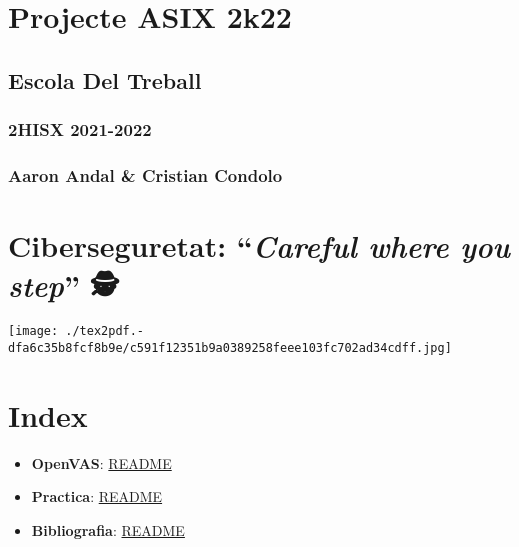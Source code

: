 \documentclass[]{article}
\date{}
\begin{document}
\hypertarget{projecte-asix-2k22}{%
\section{\texorpdfstring{\textbf{Projecte ASIX
2k22}}{Projecte ASIX 2k22}}\label{projecte-asix-2k22}}

\hypertarget{escola-del-treball}{%
\subsection{\texorpdfstring{\textbf{Escola Del
Treball}}{Escola Del Treball}}\label{escola-del-treball}}

\hypertarget{hisx-2021-2022}{%
\subsubsection{\texorpdfstring{\textbf{2HISX
2021-2022}}{2HISX 2021-2022}}\label{hisx-2021-2022}}

\hypertarget{aaron-andal-cristian-condolo}{%
\subsubsection{\texorpdfstring{\textbf{Aaron Andal \& Cristian
Condolo}}{Aaron Andal \& Cristian Condolo}}\label{aaron-andal-cristian-condolo}}

\hypertarget{ciberseguretat-careful-where-you-step-uxfe0f}{%
\section{\texorpdfstring{\textbf{Ciberseguretat}: ``\emph{Careful where
you step}'' 🕵️
🔎}{Ciberseguretat: ``Careful where you step'' 🕵️ 🔎}}\label{ciberseguretat-careful-where-you-step-uxfe0f}}

\texttt{[image: ./tex2pdf.-dfa6c35b8fcf8b9e/c591f12351b9a0389258feee103fc702ad34cdff.jpg]}

\hypertarget{index}{%
\section{Index}\label{index}}

\begin{itemize}
\item
  \textbf{OpenVAS}: \protect\hyperlink{descripciuxf3biografia}{README}
\item
  \textbf{Practica}: \protect\hyperlink{practica}{README}
\item
  \textbf{Bibliografia}: \protect\hyperlink{bibliografia}{README}
\end{itemize}
\end{document}
